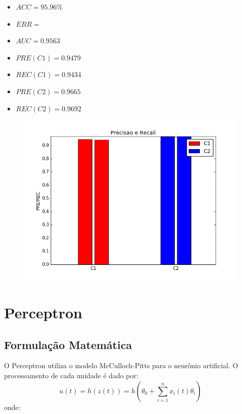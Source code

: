 \documentclass[11pt,a4paper]{article}
\numberwithin{equation}{section}
\begin{document}
\begin{minipage}{.5\textwidth}
\begin{itemize}
\item $ACC = 95.96 \%$
\item $ERR =  $
\item $AUC = 0.9563 $
\item $PRE(C1) = 0.9479$
\item $REC(C1) = 0.9434$
\item $PRE(C2) = 0.9665$
\item $REC(C2) = 0.9692$
\end{itemize}
\end{minipage}%
\begin{minipage}{.5\textwidth}
\begin{figure}[H]
\centering
  \includegraphics[width=\linewidth]{../img/log_reg_rec.png}
  \label{fig:percep}
\end{figure}
\end{minipage}%


\section{Perceptron}
\subsection{Formulação Matemática}
O Perceptron utiliza o modelo McCulloch-Pitts para o neurônio artificial. O processamento de cada unidade é dado por:
\[ u(t) = h(z(t)) = h \left( \theta_0 + \sum_{i=1}^n x_i(t) \theta_i \right) \]
onde:
\end{document}
